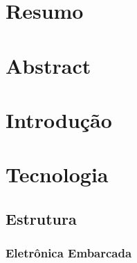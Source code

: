 \chapter{Resumo} %


\chapter{Abstract} %




\chapter{Introdução} %


\chapter{Tecnologia}

\section{Estrutura} %


\subsection{Eletrônica Embarcada} %

